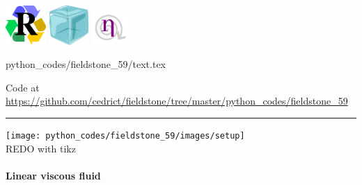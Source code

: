 
\includegraphics[height=1.5cm]{images/pictograms/replication}
\includegraphics[height=1.5cm]{images/pictograms/ice}
\includegraphics[height=1.25cm]{images/pictograms/nonlinear}

\begin{flushright} {\tiny {\color{gray} python\_codes/fieldstone\_59/text.tex}} \end{flushright}



\begin{center}
Code at \url{https://github.com/cedrict/fieldstone/tree/master/python_codes/fieldstone_59}
\end{center}

\par\noindent\rule{\textwidth}{0.4pt}





\begin{center}
\texttt{[image: python\_codes/fieldstone\_59/images/setup]}\\
{\captionfont REDO with tikz}
\end{center}

\paragraph{Linear viscous fluid}

